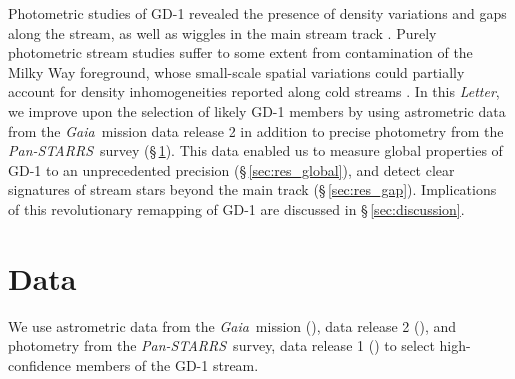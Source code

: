 \documentclass[modern]{aastex62}
\newcommand{\acronym}[1]{{\small{#1}}}
\newcommand{\gaia}{\textsl{Gaia}}
\newcommand{\pans}{\textsl{Pan-STARRS}}
\newcommand{\DR}{\acronym{DR2}}
\newcommand{\article}{\textsl{Letter}}
\newcommand{\todo}[1]{{\color{red} TODO: #1}}
\begin{document}
Photometric studies of GD-1 revealed the presence of density variations and gaps along the stream, as well as wiggles in the main stream track \citep[][]{Carlberg:2013, DeBoer:2018}.
Purely photometric stream studies suffer to some extent from contamination of the Milky Way foreground, whose small-scale spatial variations could partially account for density inhomogeneities reported along cold streams \citep[e.g.,][]{Ibata:2016}.
In this \article, we improve upon the selection of likely GD-1 members by using astrometric data from the \gaia\ mission data release 2 in addition to precise photometry from the \pans\ survey (\S\,\ref{sec:data}).
This data enabled us to measure global properties of GD-1 to an unprecedented precision (\S\,\ref{sec:res_global}), and detect clear signatures of stream stars beyond the main track (\S\,\ref{sec:res_gap}).
Implications of this revolutionary remapping of GD-1 are discussed in \S\,\ref{sec:discussion}.
% 


\section{Data}
\label{sec:data}

We use astrometric data from the \gaia\ mission (\citealt{Prusti:2016}), data
release 2 (\citealt{Gaia-Collaboration:2018, Lindegren:2018}), and photometry
from the \pans\ survey, data release 1 (\citealt{Chambers:2016}) to select
high-confidence members of the GD-1 stream.
\end{document}
